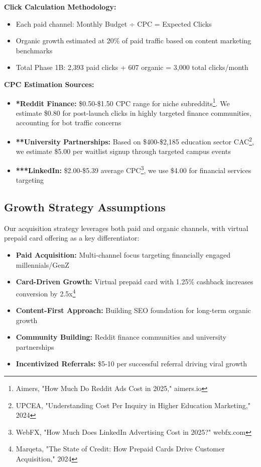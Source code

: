 \documentclass[11pt,letterpaper]{article}
\begin{document}
\textbf{Click Calculation Methodology:}
\begin{itemize}
\item Each paid channel: Monthly Budget ÷ CPC = Expected Clicks
\item Organic growth estimated at 20\% of paid traffic based on content marketing benchmarks
\item Total Phase 1B: 2,393 paid clicks + 607 organic = 3,000 total clicks/month
\end{itemize}

\textbf{CPC Estimation Sources:}
\begin{itemize}
\item \textbf{*Reddit Finance:} \$0.50-\$1.50 CPC range for niche subreddits\footnote{Aimers, "How Much Do Reddit Ads Cost in 2025," aimers.io}. We estimate \$0.80 for post-launch clicks in highly targeted finance communities, accounting for bot traffic concerns
\item \textbf{**University Partnerships:} Based on \$400-\$2,185 education sector CAC\footnote{UPCEA, "Understanding Cost Per Inquiry in Higher Education Marketing," 2024}, we estimate \$5.00 per waitlist signup through targeted campus events
\item \textbf{***LinkedIn:} \$2.00-\$5.39 average CPC\footnote{WebFX, "How Much Does LinkedIn Advertising Cost in 2025?" webfx.com}, we use \$4.00 for financial services targeting
\end{itemize}
\newpage

\subsection{Growth Strategy Assumptions}

Our acquisition strategy leverages both paid and organic channels, with virtual prepaid card offering as a key differentiator:

\begin{itemize}
\item \textbf{Paid Acquisition:} Multi-channel focus targeting financially engaged millennials/GenZ
\item \textbf{Card-Driven Growth:} Virtual prepaid card with 1.25\% cashback increases conversion by 2.5x\footnote{Marqeta, "The State of Credit: How Prepaid Cards Drive Customer Acquisition," 2024}
\item \textbf{Content-First Approach:} Building SEO foundation for long-term organic growth
\item \textbf{Community Building:} Reddit finance communities and university partnerships
\item \textbf{Incentivized Referrals:} \$5-10 per successful referral driving viral growth
\end{itemize}
\end{document}
